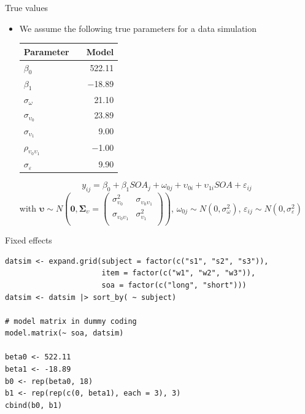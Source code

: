 \documentclass[aspectratio=169]{beamer}
\newcommand{\gvect}[1]{\boldsymbol{#1}}
\newcommand{\gmat}[1]{\boldsymbol{#1}}
\begin{document}
\begin{frame}{True values}
  \begin{itemize}
    \item We assume the following true parameters for a data simulation
    \vspace{.2cm}
  \begin{center}
  \begin{tabular}{lrr}
    \hline
    Parameter && Model \\
    \hline
    $\beta_0$                     && 522.11\\
    $\beta_1$                     && $-$18.89\\
    $\sigma_{\omega}$             && 21.10\\
    $\sigma_{\upsilon_0}$         && 23.89\\
    $\sigma_{\upsilon_1}$         && 9.00\\
    $\rho_{\upsilon_0\upsilon_1}$ && $-$1.00\\
    $\sigma_{\varepsilon}$        && 9.90\\
    \hline
  \end{tabular}
  \end{center}
     \[
       y_{ij} = \beta_0 + \beta_1 SOA_j + \omega_{0j} + \upsilon_{0i} +
       \upsilon_{1i} SOA + \varepsilon_{ij} 
  \]
\small
with $\gvect{\upsilon} \sim N\left(\gvect{0}, \gmat{\Sigma}_{\upsilon} = 
    \begin{pmatrix}
      \sigma^2_{\upsilon_0} & \sigma_{\upsilon_0\upsilon_1} \\
      \sigma_{\upsilon_0\upsilon_1} & \sigma^2_{\upsilon_1} \\
    \end{pmatrix}\right)$,
  $\omega_{0j} \sim N(0, \sigma_{\omega}^2)$, $\varepsilon_{ij} \sim N(0,
  \sigma_{\varepsilon}^2)$ 
  \end{itemize}
\end{frame}

\begin{frame}[fragile]{Fixed effects}
  \begin{lstlisting}
datsim <- expand.grid(subject = factor(c("s1", "s2", "s3")),
                      item = factor(c("w1", "w2", "w3")),
                      soa = factor(c("long", "short")))
datsim <- datsim |> sort_by( ~ subject)

# model matrix in dummy coding
model.matrix(~ soa, datsim)

beta0 <- 522.11
beta1 <- -18.89
b0 <- rep(beta0, 18)
b1 <- rep(rep(c(0, beta1), each = 3), 3)
cbind(b0, b1)
  \end{lstlisting}
\end{frame}
\end{document}
